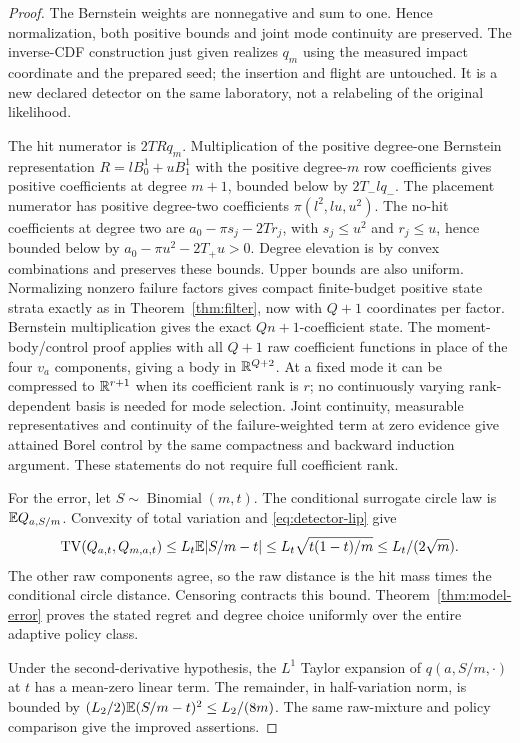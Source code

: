 \begin{proof}
The Bernstein weights are nonnegative and sum to one. Hence normalization, both positive bounds and joint mode continuity are preserved. The inverse-CDF construction just given realizes $q_m$ using the measured impact coordinate and the prepared seed; the insertion and flight are untouched. It is a new declared detector on the same laboratory, not a relabeling of the original likelihood.

The hit numerator is $2TRq_m$. Multiplication of the positive degree-one Bernstein representation $R=lB_0^1+uB_1^1$ with the positive degree-$m$ row coefficients gives positive coefficients at degree $m+1$, bounded below by $2T_-lq_-$. The placement numerator has positive degree-two coefficients $\pi(l^2,lu,u^2)$. The no-hit coefficients at degree two are $a_0-\pi s_j-2Tr_j$, with $s_j\le u^2$ and $r_j\le u$, hence bounded below by $a_0-\pi u^2-2T_+u>0$. Degree elevation is by convex combinations and preserves these bounds. Upper bounds are also uniform. Normalizing nonzero failure factors gives compact finite-budget positive state strata exactly as in Theorem~\ref{thm:filter}, now with $Q+1$ coordinates per factor. Bernstein multiplication gives the exact $Qn+1$-coefficient state. The moment-body/control proof applies with all $Q+1$ raw coefficient functions in place of the four $v_a$ components, giving a body in $\mathbb R^{Q+2}$. At a fixed mode it can be compressed to $\mathbb R^{r+1}$ when its coefficient rank is $r$; no continuously varying rank-dependent basis is needed for mode selection. Joint continuity, measurable representatives and continuity of the failure-weighted term at zero evidence give attained Borel control by the same compactness and backward induction argument. These statements do not require full coefficient rank.

For the error, let $S\sim\operatorname{Binomial}(m,t)$. The conditional surrogate circle law is $\mathbb E Q_{a,S/m}$. Convexity of total variation and \eqref{eq:detector-lip} give
\[
 \operatorname{TV}(Q_{a,t},Q_{m,a,t})\le L_t\mathbb E|S/m-t|
 \le L_t\sqrt{t(1-t)/m}\le L_t/(2\sqrt m).
\]
The other raw components agree, so the raw distance is the hit mass times the conditional circle distance. Censoring contracts this bound. Theorem~\ref{thm:model-error} proves the stated regret and degree choice uniformly over the entire adaptive policy class.

Under the second-derivative hypothesis, the $L^1$ Taylor expansion of $q(a,S/m,\cdot)$ at $t$ has a mean-zero linear term. The remainder, in half-variation norm, is bounded by $(L_2/2)\mathbb E(S/m-t)^2\le L_2/(8m)$. The same raw-mixture and policy comparison give the improved assertions.


\end{proof}
